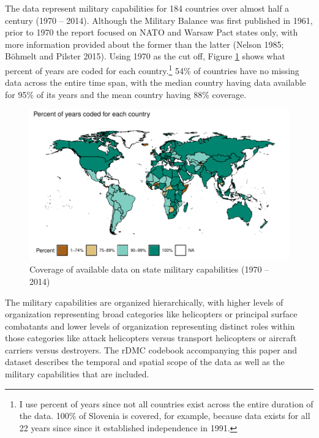 \documentclass[
]{article}
\begin{document}
The data represent military capabilities for 184 countries over almost half a century (1970 -- 2014). Although the Military Balance was first published in 1961, prior to 1970 the report focused on NATO and Warsaw Pact states only, with more information provided about the former than the latter (Nelson 1985; Böhmelt and Pilster 2015). Using 1970 as the cut off, Figure \ref{fig:missingness} shows what percent of years are coded for each country.\footnote{I use percent of years since not all countries exist across the entire duration of the data. 100\% of Slovenia is covered, for example, because data exists for all 22 years since since it established independence in 1991.} 54\% of countries have no missing data across the entire time span, with the median country having data available for 95\% of its years and the mean country having 88\% coverage.

\begin{figure}[H]

{\centering \includegraphics{2021-10-05_rDMC_files/figure-latex/missingness-1} 

}

\caption{Coverage of available data on state military capabilities (1970 -- 2014)}\label{fig:missingness}
\end{figure}

The military capabilities are organized hierarchically, with higher levels of organization representing broad categories like helicopters or principal surface combatants and lower levels of organization representing distinct roles within those categories like attack helicopters versus transport helicopters or aircraft carriers versus destroyers. The rDMC codebook accompanying this paper and dataset describes the temporal and spatial scope of the data as well as the military capabilities that are included.
\end{document}
